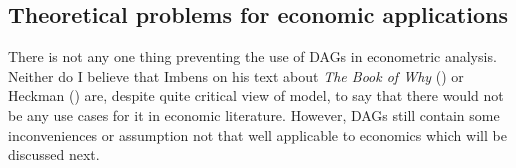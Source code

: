 \documentclass[main=english,12pt,a4paper,pdftex,econ,utf8]{aaltothesis}
\begin{document}
\begin{comment}
For other parts the only thing these articles are taking from DAG framework is the basic structure and way to present the structure which is completely comprehensible with the knowledge provided in the section \ref{section:overview} and equation \ref{eq:lmc}.
Also the fact that these are only establishing Granger causality between variables, so analysis is just concentrated on correlations and thus none provides any economic usage of the identification tools that are associated with graphs nor any use for do-calculus. Also as it is not intended to measure actual causality these graphs could not fulfill the completeness requirement of CI in graphs. As an example the Selma Jaytech's paper is only using prince information of stocks and bonds from different countries as determining variables for other countries price variables. It of course could not be adequate model to make complete graph as the international asset markets are not some fully endogenous self defining system, but rather there is some exogenous factors that affecting the movements. All of this might very well be sufficient for the purpose of the study, but at the same time it is making these studies, from the standpoint of graphical models and CI, not that great of an examples for the use of theoretical framework of DAG CI in economics. In other words these papers are using DAGs just as a way to present models visually and the PC algorithm as statistical test for the direction of flow of correlations in time, which makes the model kind of truncated and leaves lot on table for the part of DAG CI. Methods here use the DAG methods only for finding out the structure but not identifying the causality, since this setup is only able to measure Granger causality.
\end{comment}


\subsection{Theoretical problems for economic applications}\label{subsection:problems}

There is not any one thing preventing the use of DAGs in econometric analysis. Neither do I believe that Imbens on his text about \textit{The Book of Why} (\cite{PearlMackenzie18}) or Heckman (\cite{Heckman2015}) are, despite quite critical view of model, to say that there would not be any use cases for it in economic literature. However, DAGs still contain some inconveniences or assumption not that well applicable to economics which will be discussed next.
\end{document}

